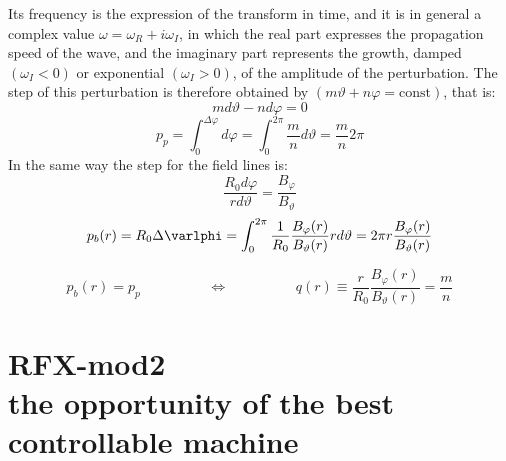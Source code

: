 Its frequency is the expression of the transform in time, and it is in general a complex value $\omega = \omega_R + i \omega_I$, in which the real part expresses the propagation speed of the wave, and the imaginary part represents the growth, damped $(\omega_I < 0)$ or exponential $(\omega_I > 0)$, of the amplitude of the perturbation. The step of this perturbation is therefore obtained by $(m\vartheta + n\varphi = \text{const})$, that is:
$$  m d\vartheta - n d\varphi = 0    $$
$$  p_p = \int_0^{\Delta\varphi} d\varphi = \int_0^{2\pi} \frac{m}{n}d\vartheta = \frac{m}{n} 2\pi  $$
In the same way the step for the field lines is:
$$  \frac{R_0 d\varphi}{r d\vartheta} = \frac{B_\varphi}{B_\vartheta} $$
$$  p_b(r) = R_0\Delta\varlphi = \int_0^{2\pi} \frac{1}{R_0} \frac{B_\varphi(r)}{B_\vartheta(r)} r d\vartheta = 2\pi r \frac{B_\varphi(r)}{B_\vartheta(r)}  $$

\begin{equation}
    p_b(r) = p_p    \hspace{2cm} 	\iff \hspace{2cm}  q(r)\equiv \frac{r}{R_0}\frac{B_\varphi(r)}{B_\vartheta(r)}=\frac{m}{n}
\end{equation}




\section{RFX-mod2 \\ \small{the opportunity of the best controllable machine}}
\cite{SONATO2003161}
\cite{doi:10.1063/1.4806765}
\cite{martin_RFX_overview}



